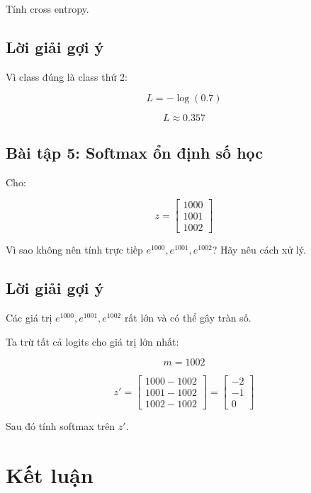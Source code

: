 Tính cross entropy.

\subsection*{Lời giải gợi ý}

Vì class đúng là class thứ 2:

\[
    L=-\log(0.7)
\]

\[
    L\approx 0.357
\]

\subsection*{Bài tập 5: Softmax ổn định số học}

Cho:

\[
    z =
    \begin{bmatrix}
    1000\\
    1001\\
    1002
    \end{bmatrix}
\]

Vì sao không nên tính trực tiếp $e^{1000},e^{1001},e^{1002}$? Hãy nêu cách xử lý.

\subsection*{Lời giải gợi ý}

Các giá trị $e^{1000},e^{1001},e^{1002}$ rất lớn và có thể gây tràn số.

Ta trừ tất cả logits cho giá trị lớn nhất:

\[
    m=1002
\]

\[
    z' =
    \begin{bmatrix}
    1000-1002\\
    1001-1002\\
    1002-1002
    \end{bmatrix}
    =
    \begin{bmatrix}
    -2\\
    -1\\
    0
    \end{bmatrix}
\]

Sau đó tính softmax trên $z'$.

\section*{Kết luận}

